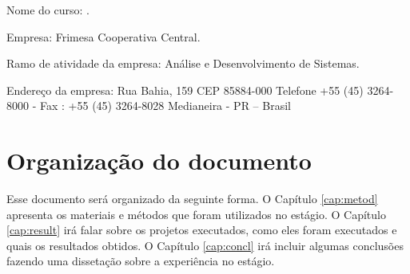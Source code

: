 Nome do curso: \UTFPRprogramadata.

Empresa: Frimesa Cooperativa Central.

Ramo de atividade da empresa: Análise e Desenvolvimento de Sistemas.

Endereço da empresa: 
Rua Bahia, 159 CEP 85884-000
Telefone +55 (45) 3264-8000 - Fax : +55 (45) 3264-8028
Medianeira - PR – Brasil

\section{Organização do documento}

Esse documento será organizado da seguinte forma. O Capítulo \ref{cap:metod} apresenta os materiais e métodos que foram utilizados no estágio. O Capítulo \ref{cap:result} irá falar sobre os projetos executados, como eles foram executados e quais os resultados obtidos. O Capítulo \ref{cap:concl} irá incluir algumas conclusões fazendo uma dissetação sobre a experiência no estágio.

